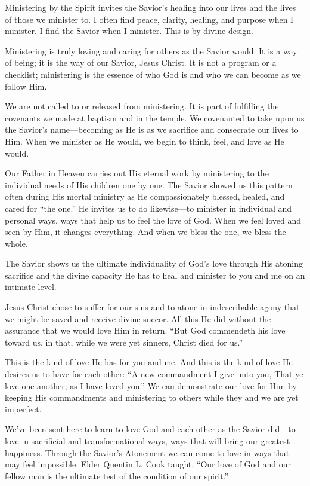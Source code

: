 \documentclass[letterpaper, 11pt]{report}
\begin{document}
Ministering by the Spirit invites the Savior’s healing into our lives and the lives of those we minister to. I often find peace, clarity, healing, and purpose when I minister. I find the Savior when I minister. This is by divine design.

Ministering is truly loving and caring for others as the Savior would. It is a way of being; it is the way of our Savior, Jesus Christ. It is not a program or a checklist; ministering is the essence of who God is and who we can become as we follow Him.

We are not called to or released from ministering. It is part of fulfilling the covenants we made at baptism and in the temple. We covenanted to take upon us the Savior’s name—becoming as He is as we sacrifice and consecrate our lives to Him. When we minister as He would, we begin to think, feel, and love as He would.

Our Father in Heaven carries out His eternal work by ministering to the individual needs of His children one by one. The Savior showed us this pattern often during His mortal ministry as He compassionately blessed, healed, and cared for “the one.” He invites us to do likewise—to minister in individual and personal ways, ways that help us to feel the love of God. When we feel loved and seen by Him, it changes everything. And when we bless the one, we bless the whole.

The Savior shows us the ultimate individuality of God’s love through His atoning sacrifice and the divine capacity He has to heal and minister to you and me on an intimate level.

Jesus Christ chose to suffer for our sins and to atone in indescribable agony that we might be saved and receive divine succor. All this He did without the assurance that we would love Him in return. “But God commendeth his love toward us, in that, while we were yet sinners, Christ died for us.”

This is the kind of love He has for you and me. And this is the kind of love He desires us to have for each other: “A new commandment I give unto you, That ye love one another; as I have loved you.” We can demonstrate our love for Him by keeping His commandments and ministering to others while they and we are yet imperfect.

We’ve been sent here to learn to love God and each other as the Savior did—to love in sacrificial and transformational ways, ways that will bring our greatest happiness. Through the Savior’s Atonement we can come to love in ways that may feel impossible. Elder Quentin L. Cook taught, “Our love of God and our fellow man is the ultimate test of the condition of our spirit.”
\end{document}
